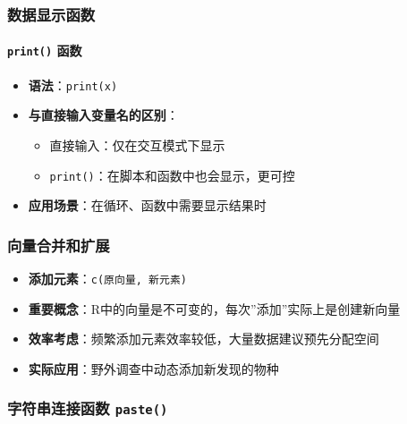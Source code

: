 \documentclass[
]{book}
\providecommand{\tightlist}{%
  \setlength{\itemsep}{0pt}\setlength{\parskip}{0pt}}
\begin{document}
\hypertarget{ux6570ux636eux663eux793aux51fdux6570}{%
\subsubsection{数据显示函数}\label{ux6570ux636eux663eux793aux51fdux6570}}

\hypertarget{print-ux51fdux6570}{%
\paragraph{\texorpdfstring{\texttt{print()} 函数}{print() 函数}}\label{print-ux51fdux6570}}

\begin{itemize}
\tightlist
\item
  \textbf{语法}：\texttt{print(x)}
\item
  \textbf{与直接输入变量名的区别}：

  \begin{itemize}
  \tightlist
  \item
    直接输入：仅在交互模式下显示
  \item
    \texttt{print()}：在脚本和函数中也会显示，更可控
  \end{itemize}
\item
  \textbf{应用场景}：在循环、函数中需要显示结果时
\end{itemize}

\hypertarget{ux5411ux91cfux5408ux5e76ux548cux6269ux5c55}{%
\subsubsection{向量合并和扩展}\label{ux5411ux91cfux5408ux5e76ux548cux6269ux5c55}}

\begin{itemize}
\tightlist
\item
  \textbf{添加元素}：\texttt{c(原向量,\ 新元素)}
\item
  \textbf{重要概念}：R中的向量是不可变的，每次''添加''实际上是创建新向量
\item
  \textbf{效率考虑}：频繁添加元素效率较低，大量数据建议预先分配空间
\item
  \textbf{实际应用}：野外调查中动态添加新发现的物种
\end{itemize}

\hypertarget{ux5b57ux7b26ux4e32ux8fdeux63a5ux51fdux6570-paste}{%
\subsubsection{\texorpdfstring{字符串连接函数 \texttt{paste()}}{字符串连接函数 paste()}}\label{ux5b57ux7b26ux4e32ux8fdeux63a5ux51fdux6570-paste}}
\end{document}
